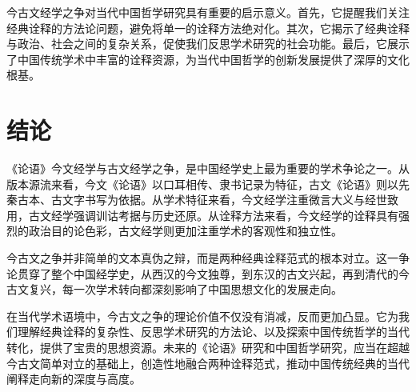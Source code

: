 \documentclass[12pt,a4paper]{article}
\begin{document}
今古文经学之争对当代中国哲学研究具有重要的启示意义。首先，它提醒我们关注经典诠释的方法论问题，避免将单一的诠释方法绝对化。其次，它揭示了经典诠释与政治、社会之间的复杂关系，促使我们反思学术研究的社会功能。最后，它展示了中国传统学术中丰富的诠释资源，为当代中国哲学的创新发展提供了深厚的文化根基。

\section{结论}

《论语》今文经学与古文经学之争，是中国经学史上最为重要的学术争论之一。从版本源流来看，今文《论语》以口耳相传、隶书记录为特征，古文《论语》则以先秦古本、古文字书写为依据。从学术特征来看，今文经学注重微言大义与经世致用，古文经学强调训诂考据与历史还原。从诠释方法来看，今文经学的诠释具有强烈的政治目的论色彩，古文经学则更加注重学术的客观性和独立性。

今古文之争并非简单的文本真伪之辩，而是两种经典诠释范式的根本对立。这一争论贯穿了整个中国经学史，从西汉的今文独尊，到东汉的古文兴起，再到清代的今古文复兴，每一次学术转向都深刻影响了中国思想文化的发展走向。

在当代学术语境中，今古文之争的理论价值不仅没有消减，反而更加凸显。它为我们理解经典诠释的复杂性、反思学术研究的方法论、以及探索中国传统哲学的当代转化，提供了宝贵的思想资源。未来的《论语》研究和中国哲学研究，应当在超越今古文简单对立的基础上，创造性地融合两种诠释范式，推动中国传统经典的当代阐释走向新的深度与高度。
\end{document}
